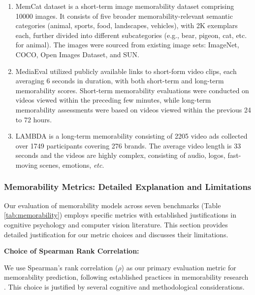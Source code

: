 \begin{enumerate}
         \item MemCat \cite{goetschalckx2019memcat} dataset is a short-term image memorability dataset comprising 10000 images. It consists of five broader memorability-relevant semantic categories (animal, sports, food, landscapes, vehicles), with 2K exemplars each, further divided into different subcategories (e.g., bear, pigeon, cat, etc. for animal). The images were sourced from existing image sets: ImageNet, COCO, Open Images Dataset, and SUN. 
            \item MediaEval \cite{Kiziltepe2021} utilized publicly available links to short-form video clips, each averaging 6 seconds in duration, with both short-term and long-term memorability scores. Short-term memorability evaluations were conducted on videos viewed within the preceding few minutes, while long-term memorability assessments were based on videos viewed within the previous 24 to 72 hours.
            \item LAMBDA \cite{si2023long} is a long-term memorability consisting of 2205 video ads collected over 1749 participants covering 276 brands. The average video length is 33 seconds and the videos are highly complex, consisting of audio, logos, fast-moving scenes, emotions, \textit{etc}.
\end{enumerate}

\subsubsection{Memorability Metrics: Detailed Explanation and Limitations}
\label{sec:Memorability Metrics}

Our evaluation of memorability models across seven benchmarks (Table \ref{tab:memorability}) employs specific metrics with established justifications in cognitive psychology and computer vision literature. This section provides detailed justification for our metric choices and discusses their limitations.

\textbf{Choice of Spearman Rank Correlation:}

We use Spearman's rank correlation ($\rho$) as our primary evaluation metric for memorability prediction, following established practices in memorability research \cite{khosla2015understanding,cohendet2019videomem,newman2020multimodal}. This choice is justified by several cognitive and methodological considerations. 

